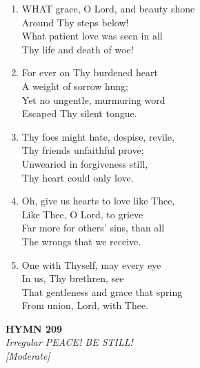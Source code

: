 \documentclass[11pt,a4paper]{article}
\begin{document}
\begin{enumerate}
    \item WHAT grace, O Lord, and beauty shone \\
        Around Thy steps below! \\
        What patient love was seen in all \\
        Thy life and death of woe!

    \item For ever on Thy burdened heart \\
        A weight of sorrow hung; \\
        Yet no ungentle, murmuring word \\
        Escaped Thy silent tongue.

    \item Thy foes might hate, despise, revile, \\
        Thy friends unfaithful prove; \\
        Unwearied in forgiveness still, \\
        Thy heart could only love.

    \item Oh, give us hearts to love like Thee, \\
        Like Thee, O Lord, to grieve \\
        Far more for others' sins, than all \\
        The wrongs that we receive.

    \item One with Thyself, may every eye \\
        In us, Thy brethren, see \\
        That gentleness and grace that spring \\
        From union, Lord, with Thee.

\end{enumerate}

\newpage
\begin{center}
    {\Large \textbf{HYMN 209}}
    \\
    \textit{Irregular PEACE! BE STILL!}
    \\
    \textit{\small [Moderate]}
\end{center}
\vspace{1em}
\end{document}
